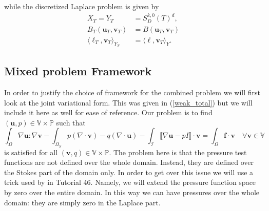 \documentclass[12pt,a4paper]{article}
\theoremstyle{definition}
\begin{document}
while the discretized Laplace problem is given by 
\begin{equation}\label{frame_laplace_disc}
\begin{aligned}
X_T=Y_T&=S^{k,0}_D\left(T\right)^d,\\
B_T\left(\textbf{u}_T,\textbf{v}_T\right)&=B\left(\textbf{u}_T,\textbf{v}_T\right)\\
\langle \ell_T,\textbf{v}_T \rangle_{Y_T} &=\langle \ell,\textbf{v}_T \rangle_{Y}.
\end{aligned}
\end{equation}
\subsection{Mixed problem Framework}
In order to justify the choice of framework for the combined problem we will first look at the joint variational form.  This was given in (\ref{weak_total}) but we will include it here as well for ease of reference.  Our problem is to find $\left(\textbf{u},p\right)\in \mathbb{V}\times\mathbb{P}$ such that
\begin{equation}
\int_{\Omega}\nabla \textbf{u} : \nabla \textbf{v}-\int_{\Omega_S}p\left(\nabla \cdot \textbf{v}\right)-q\left(\nabla \cdot \textbf{u}\right)  - \int_{\mathcal{I}} \llbracket\nabla\textbf{u}-pI\rrbracket\cdot\textbf{v} =\int_{\Omega}\textbf{f}\cdot \textbf{v} \quad \forall  \textbf{v}\in \mathbb{V}
\end{equation}
is satisfied for all $\left(\textbf{v},q\right)\in \mathbb{V}\times\mathbb{P}$.  The problem here is that the pressure test functions are not defined over the whole domain.  Instead, they are defined over the Stokes part of the domain only.  In order to get over this issue we will use a trick used by \cite{BangerthHartmannKanschat2007} in Tutorial 46.  Namely, we will extend the pressure function space by zero over the entire domain.  In this way we can have pressures over the whole  domain: they are simply zero in the Laplace part.
\end{document}
